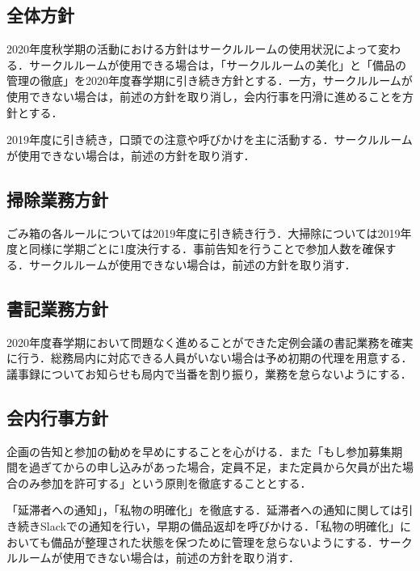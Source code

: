 \subsection*{全体方針}
2020年度秋学期の活動における方針はサークルルームの使用状況によって変わる．サークルルームが使用できる場合は，「サークルルームの美化」と「備品の管理の徹底」を2020年度春学期に引き続き方針とする．一方，サークルルームが使用できない場合は，前述の方針を取り消し，会内行事を円滑に進めることを方針とする．

2019年度に引き続き，口頭での注意や呼びかけを主に活動する．サークルルームが使用できない場合は，前述の方針を取り消す．

\subsection*{掃除業務方針}
ごみ箱の各ルールについては2019年度に引き続き行う．大掃除については2019年度と同様に学期ごとに1度決行する．事前告知を行うことで参加人数を確保する．サークルルームが使用できない場合は，前述の方針を取り消す．

\subsection*{書記業務方針}
2020年度春学期において問題なく進めることができた定例会議の書記業務を確実に行う．総務局内に対応できる人員がいない場合は予め初期の代理を用意する．議事録についてお知らせも局内で当番を割り振り，業務を怠らないようにする．

\subsection*{会内行事方針}
企画の告知と参加の勧めを早めにすることを心がける．また「もし参加募集期間を過ぎてからの申し込みがあった場合，定員不足，また定員から欠員が出た場合のみ参加を許可する」という原則を徹底することとする．

「延滞者への通知」，「私物の明確化」を徹底する．延滞者への通知に関しては引き続きSlackでの通知を行い，早期の備品返却を呼びかける．「私物の明確化」においても備品が整理された状態を保つために管理を怠らないようにする．サークルルームが使用できない場合は，前述の方針を取り消す．

